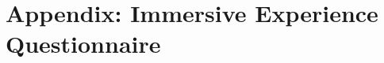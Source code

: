 \documentclass[12pt,twoside,english]{article}
\begin{document}





% 


\appendix
\section{Appendix: Immersive Experience Questionnaire}
\label{sect:appendix}
\label{sect:ieq}


\clearpage
\end{document}
